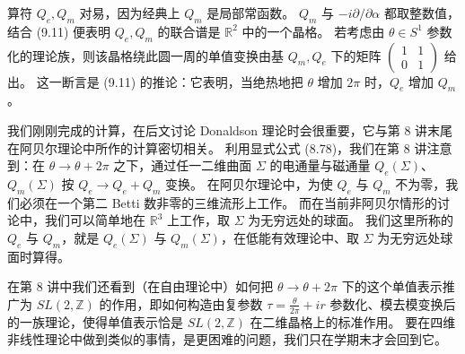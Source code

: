 

算符 $Q_e,Q_m$ 对易，因为经典上 $Q_m$ 是局部常函数。
$Q_m$ 与 $-i\partial/\partial\alpha$ 都取整数值，结合 (9.11) 便表明 $Q_e,Q_m$ 的联合谱是 $\mathbb{R}^2$ 中的一个晶格。
若考虑由 $\theta\in S^1$ 参数化的理论族，则该晶格绕此圆一周的单值变换由基 $Q_m,Q_e$ 下的矩阵 $\begin{pmatrix}1&1\\0&1\end{pmatrix}$ 给出。
这一断言是 (9.11) 的推论：它表明，当绝热地把 $\theta$ 增加 $2\pi$ 时，$Q_e$ 增加 $Q_m$。

我们刚刚完成的计算，在后文讨论 Donaldson 理论时会很重要，它与第 8 讲末尾在阿贝尔理论中所作的计算密切相关。
利用显式公式 (8.78)，我们在第 8 讲注意到：在 $\theta\to\theta+2\pi$ 之下，通过任一二维曲面 $\Sigma$ 的电通量与磁通量 $Q_e(\Sigma)$、$Q_m(\Sigma)$ 按 $Q_e\to Q_e+Q_m$ 变换。
在阿贝尔理论中，为使 $Q_e$ 与 $Q_m$ 不为零，我们必须在一个第二 Betti 数非零的三维流形上工作。
而在当前非阿贝尔情形的讨论中，我们可以简单地在 $\mathbb{R}^3$ 上工作，取 $\Sigma$ 为无穷远处的球面。
我们这里所称的 $Q_e$ 与 $Q_m$，就是 $Q_e(\Sigma)$ 与 $Q_m(\Sigma)$，在低能有效理论中、取 $\Sigma$ 为无穷远处球面时算得。

在第 8 讲中我们还看到（在自由理论中）如何把 $\theta\to\theta+2\pi$ 下的这个单值表示推广为 $SL(2,\mathbb{Z})$ 的作用，即如何构造由复参数 $\tau=\frac{\theta}{2\pi}+ir$ 参数化、模去模变换后的一族理论，使得单值表示恰是 $SL(2,\mathbb{Z})$ 在二维晶格上的标准作用。
要在四维非线性理论中做到类似的事情，是更困难的问题，我们只在学期末才会回到它。

